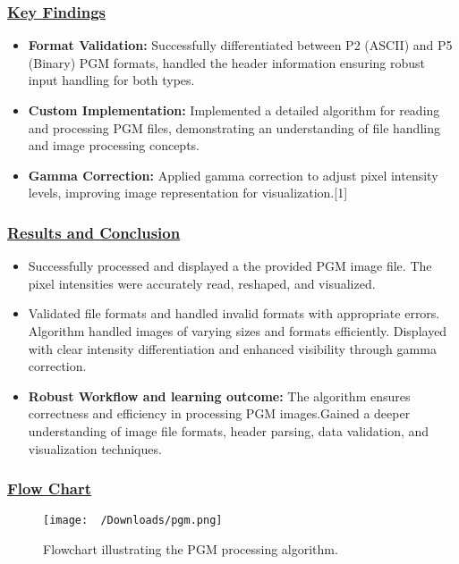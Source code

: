 \documentclass[
  11pt,
]{article}
\begin{document}
\subsubsection*{\underline{Key Findings}}

\begin{itemize}
    \item \textbf{Format Validation:} Successfully differentiated between P2 (ASCII) and P5 (Binary) PGM formats, handled the header information ensuring robust input handling for both types.
    \item \textbf{Custom Implementation:} Implemented a detailed algorithm for reading and processing PGM files, demonstrating an understanding of file handling and image processing concepts.
    \item \textbf{Gamma Correction:} Applied gamma correction to adjust pixel intensity levels, improving image representation for visualization.[1]
\end{itemize}

\subsubsection*{\underline{Results and Conclusion}}

\begin{itemize}
        \item Successfully processed and displayed a the provided PGM image file. The pixel intensities were accurately read, reshaped, and visualized.
        \item  Validated file formats and handled invalid formats with appropriate errors. Algorithm handled images of varying sizes and formats efficiently. Displayed with clear intensity differentiation and enhanced visibility through gamma correction.
    \item \textbf{Robust Workflow and learning outcome:} The algorithm ensures correctness and efficiency in processing PGM images.Gained a deeper understanding of image file formats, header parsing, data validation, and visualization techniques.
\end{itemize}

\subsubsection*{\underline{Flow Chart}}
\begin{figure}[H]
\centering
\texttt{[image: ~/Downloads/pgm.png]}
\caption{Flowchart illustrating the PGM processing algorithm.}
\label{fig:flowchart}
\end{figure}
\end{document}
